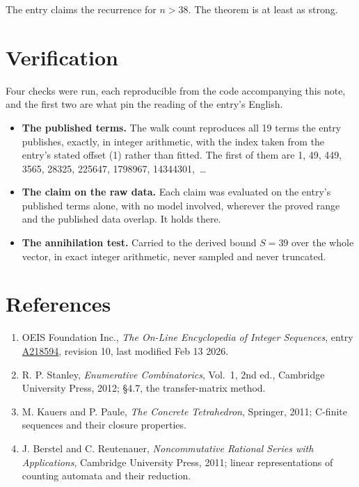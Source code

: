 \documentclass[11pt]{article}
\theoremstyle{definition}
\begin{document}
The entry claims the recurrence for $n > 38$. The theorem is at least as strong.

\section{Verification}

Four checks were run, each reproducible from the code accompanying this note, and the first two are what pin the reading of the entry's English.

\begin{itemize}

\item {\bfseries The published terms.} The walk count reproduces all 19 terms the entry publishes, exactly, in integer arithmetic, with the index taken from the entry's stated offset (1) rather than fitted. The first of them are 1, 49, 449, 3565, 28325, 225647, 1798967, 14344301,~\dots

\item {\bfseries The claim on the raw data.} Each claim was evaluated on the entry's published terms alone, with no model involved, wherever the proved range and the published data overlap. It holds there.

\item {\bfseries The annihilation test.} Carried to the derived bound $S = 39$ over the whole vector, in exact integer arithmetic, never sampled and never truncated.

\end{itemize}

\section{References}

\begin{enumerate}

\item OEIS Foundation Inc., \emph{The On-Line Encyclopedia of Integer Sequences}, entry \href{https://oeis.org/A218594}{A218594}, revision 10, last modified Feb 13 2026.

\item R. P. Stanley, \emph{Enumerative Combinatorics}, Vol.~1, 2nd ed., Cambridge University Press, 2012; \S4.7, the transfer-matrix method.

\item M. Kauers and P. Paule, \emph{The Concrete Tetrahedron}, Springer, 2011; C-finite sequences and their closure properties.

\item J. Berstel and C. Reutenauer, \emph{Noncommutative Rational Series with Applications}, Cambridge University Press, 2011; linear representations of counting automata and their reduction.

\end{enumerate}
\end{document}
